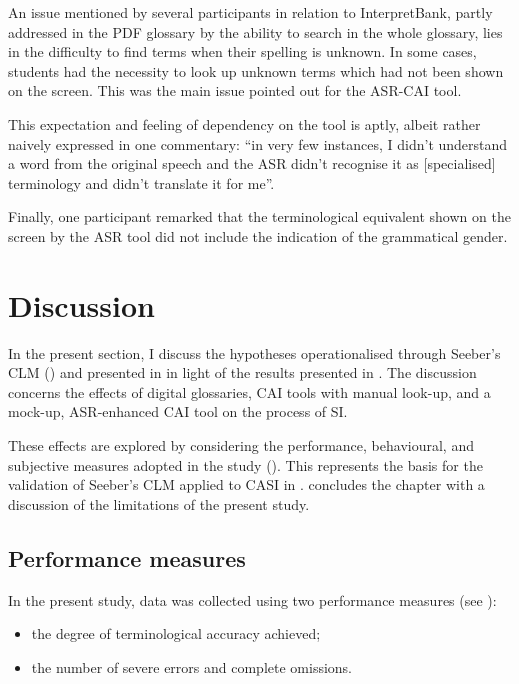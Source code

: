 An issue mentioned by several participants in relation to InterpretBank, partly addressed in the PDF glossary by the ability to search in the whole glossary, lies in the difficulty to find terms when their spelling is unknown. In some cases, students had the necessity to look up unknown terms which had not been shown on the screen. This was the main issue pointed out for the ASR-CAI tool.

This expectation and feeling of dependency on the tool is aptly, albeit rather naively expressed in one commentary: ``in very few instances, I didn't understand a word from the original speech and the ASR didn't recognise it as [specialised] terminology and didn't translate it for me''.

Finally, one participant remarked that the terminological equivalent shown on the screen by the ASR tool did not include the indication of the grammatical gender.

\section{Discussion} \label{discussion}
In the present section, I discuss the hypotheses operationalised through Seeber's CLM () and presented in  in light of the results presented in . The discussion concerns the effects of digital glossaries, CAI tools with manual look-up, and a mock-up, ASR-enhanced CAI tool on the process of SI.

These effects are explored by considering the performance, behavioural, and subjective measures adopted in the study (). This represents the basis for the validation of Seeber's CLM applied to CASI in .  concludes the chapter with a discussion of the limitations of the present study.

\subsection{Performance measures} \label{performancem_disc}
In the present study, data was collected using two performance measures (see ):

\begin{itemize}
    \item the degree of terminological accuracy achieved;
    \item the number of severe errors and complete omissions.
\end{itemize}

